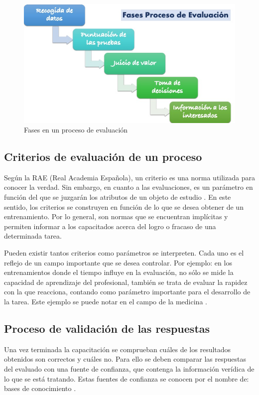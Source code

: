 \begin{figure}[h]
\centering
 \includegraphics[width=0.6\linewidth]{imagen/fases-proceso-evaluacion.jpg}
 \caption{Fases en un proceso de evaluación}
 \label{fig:fases-evaluacion} 
\end{figure}

\subsection{Criterios de evaluación de un proceso}
Según la RAE (Real Academia Española), un criterio es una norma utilizada para conocer la verdad. Sin embargo, en cuanto a las evaluaciones, es un parámetro en función del que se juzgarán los atributos de un objeto de estudio \cite{RAE2022}. En este sentido, los criterios se construyen en función de lo que se desea obtener de un entrenamiento. Por lo general, son normas que se encuentran implícitas y permiten informar a los capacitados acerca del logro o fracaso de una determinada tarea. 

Pueden existir tantos criterios como parámetros se interpreten. Cada uno es el reflejo de un campo importante que se desea controlar. Por ejemplo: en los entrenamientos donde el tiempo influye en la evaluación, no sólo se mide la capacidad de aprendizaje del profesional, también se trata de evaluar la rapidez con la que reacciona, contando como parámetro importante para el desarrollo de la tarea. Este ejemplo se puede notar en el campo de la medicina \cite{Castrillon2021}.

\subsection{Proceso de validación de las respuestas}
Una vez terminada la capacitación se comprueban cuáles de los resultados obtenidos son correctos y cuáles no. Para ello se deben comparar las respuestas del evaluado con una fuente de confianza, que contenga la información verídica de lo que se está tratando. Estas fuentes de confianza se conocen por el nombre de: bases de conocimiento \cite{Rasheed2021}.

